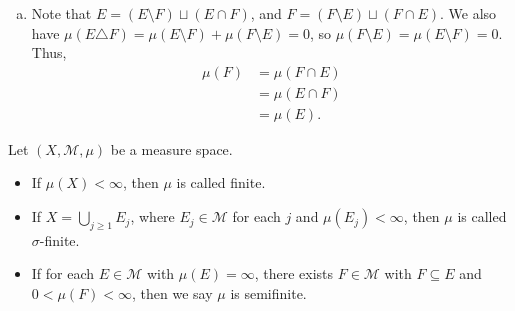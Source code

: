 \documentclass[10pt]{mypackage}
\begin{document}
\begin{solution}\hfill
  \begin{enumerate}[(a)]
    \item Note that $E = \left(E\setminus F\right) \sqcup \left(E\cap F\right)$, and $F = \left(F\setminus E\right)\sqcup \left(F\cap E\right)$. We also have $\mu\left(E\triangle F\right) = \mu\left(E\setminus F\right) + \mu\left(F\setminus E\right) = 0$, so $\mu\left(F\setminus E\right) = \mu\left(E\setminus F\right) = 0$. Thus,
      \begin{align*}
        \mu\left(F\right) &= \mu\left(F\cap E\right)\\
        &= \mu\left(E\cap F\right)\\
        &= \mu\left(E\right).
      \end{align*}
  \end{enumerate}
\end{solution}
\begin{definition}
  Let $\left(X,\mathcal{M},\mu\right)$ be a measure space.
  \begin{itemize}
    \item If $\mu\left(X\right) < \infty$, then $\mu$ is called finite.
    \item If $X = \bigcup_{j\geq 1}E_j$, where $E_j\in \mathcal{M}$ for each $j$ and $\mu\left(E_j\right) < \infty$, then $\mu$ is called $\sigma$-finite.
    \item If for each $E\in \mathcal{M}$ with $\mu\left(E\right) = \infty$, there exists $F\in \mathcal{M}$ with $F\subseteq E$ and $0 < \mu\left(F\right) < \infty$, then we say $\mu$ is semifinite.
  \end{itemize}
\end{definition}
\end{document}
